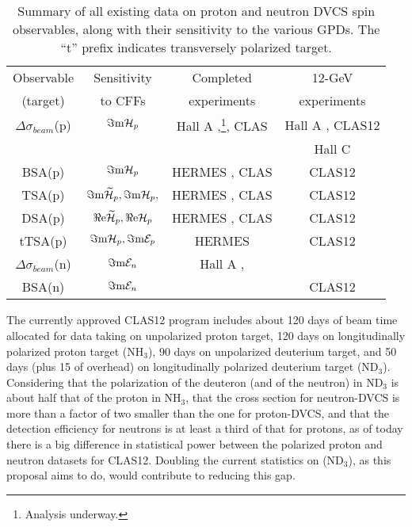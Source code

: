 \begin{savenotes}
\begin{table}[t]
   \centering
   \begin{tabular}{|c||c|c|c|} 
\hline
Observable & Sensitivity & Completed & 12-GeV \\
(target) & to CFFs & experiments & experiments \\
\hline
\hline
    $\Delta\sigma_{beam}$(p) & $\Im{\rm m}{\cal H}_p$ & Hall A \cite{carlos},\cite{E07007}\footnote{Analysis underway.}, CLAS \cite{hs} &   Hall A \cite{E1206114}, CLAS12 \cite{E1206119}\\ 
& & &Hall C \cite{E1213010}\\

\hline
    BSA(p)     &    $\Im{\rm m}{\cal H}_p$       & HERMES \cite{hermes}, CLAS \cite{stepan,fx,pisano}   & CLAS12 \cite{E1206119} \\
\hline 
   TSA(p)   &    $\Im{\rm m}\widetilde{\cal H}_p,\Im{\rm m}{\cal H}_p,$     &  HERMES \cite{hermes}, CLAS \cite{shifeng,erin,pisano} & CLAS12 \cite{E1206119}\\
\hline 
    DSA(p)    &    $\Re{\rm e}\widetilde{\cal H}_p,\Re{\rm e}{\cal H}_p$     &  HERMES \cite{hermes}, CLAS \cite{pisano}& CLAS12 \cite{E1206119}\\
\hline 
    tTSA(p)    &    $\Im{\rm m}{\cal H}_p,\Im{\rm m}{\cal E}_p$               &  HERMES \cite{hermes} &  CLAS12 \cite{E1212010}\\
\hline
    $\Delta\sigma_{beam}$(n)    &    $\Im{\rm m}{\cal E}_n$       &  Hall A \cite{malek},\cite{E08025}\footnotemark[\value{footnote}] & \\
\hline
    BSA(n)    &    $\Im{\rm m}{\cal E}_n$       &   & CLAS12 \cite{proposal}\\
\hline
   \end{tabular}
   \caption[Summary of existing and proposed DVCS experiments]
   {Summary of all existing data on proton and neutron DVCS spin observables, along with their sensitivity to the various GPDs. The ``t'' prefix indicates transversely polarized target.}\label{dvcs_exp_summary}
\end{table}
\end{savenotes}

The currently approved CLAS12 program includes about 120 days of beam time allocated for data taking on unpolarized proton target, 120 days on longitudinally polarized proton target (NH$_3$), 90 days on unpolarized deuterium target, and 50 days (plus 15 of overhead) on longitudinally polarized deuterium target (ND$_3$). Considering that the polarization of the deuteron (and of the neutron) in ND$_3$ is about half that of the proton in NH$_3$, that the cross section for neutron-DVCS is more than a factor of two smaller than the one for proton-DVCS, and that the detection efficiency for neutrons is at least a third of that for protons, as of today there is a big difference in statistical power between the polarized proton and neutron datasets for CLAS12. Doubling the current statistics on (ND$_3$), as this proposal aims to do, would contribute to reducing this gap. 
